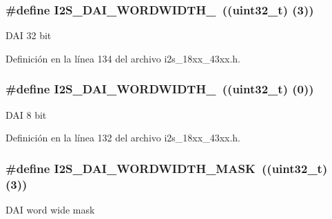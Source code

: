 \subsubsection[{\texorpdfstring{I2\+S\+\_\+\+D\+A\+I\+\_\+\+W\+O\+R\+D\+W\+I\+D\+T\+H\+\_\+32}{I2S_DAI_WORDWIDTH_32}}]{\setlength{\rightskip}{0pt plus 5cm}\#define I2\+S\+\_\+\+D\+A\+I\+\_\+\+W\+O\+R\+D\+W\+I\+D\+T\+H\+\_~((uint32\+\_\+t) (3))}\hypertarget{group___i2_s__18_x_x__43_x_x_ga576561248aa7e6f27c5ef6c51def80ed}{}\label{group___i2_s__18_x_x__43_x_x_ga576561248aa7e6f27c5ef6c51def80ed}
D\+AI 32 bit 

Definición en la línea 134 del archivo i2s\+\_\+18xx\+\_\+43xx.\+h.

\subsubsection[{\texorpdfstring{I2\+S\+\_\+\+D\+A\+I\+\_\+\+W\+O\+R\+D\+W\+I\+D\+T\+H\+\_\+8}{I2S_DAI_WORDWIDTH_8}}]{\setlength{\rightskip}{0pt plus 5cm}\#define I2\+S\+\_\+\+D\+A\+I\+\_\+\+W\+O\+R\+D\+W\+I\+D\+T\+H\+\_~((uint32\+\_\+t) (0))}\hypertarget{group___i2_s__18_x_x__43_x_x_ga8bd50ada05c4cd981f07be7a3b1002dc}{}\label{group___i2_s__18_x_x__43_x_x_ga8bd50ada05c4cd981f07be7a3b1002dc}
D\+AI 8 bit 

Definición en la línea 132 del archivo i2s\+\_\+18xx\+\_\+43xx.\+h.

\subsubsection[{\texorpdfstring{I2\+S\+\_\+\+D\+A\+I\+\_\+\+W\+O\+R\+D\+W\+I\+D\+T\+H\+\_\+\+M\+A\+SK}{I2S_DAI_WORDWIDTH_MASK}}]{\setlength{\rightskip}{0pt plus 5cm}\#define I2\+S\+\_\+\+D\+A\+I\+\_\+\+W\+O\+R\+D\+W\+I\+D\+T\+H\+\_\+\+M\+A\+SK~((uint32\+\_\+t) (3))}\hypertarget{group___i2_s__18_x_x__43_x_x_ga1177f9594c24141162839aafe829fcb9}{}\label{group___i2_s__18_x_x__43_x_x_ga1177f9594c24141162839aafe829fcb9}
D\+AI word wide mask 

